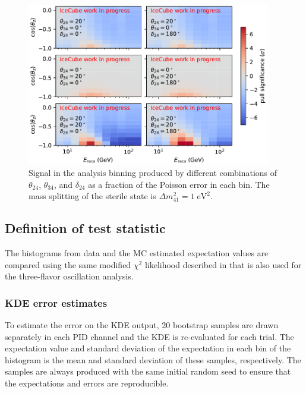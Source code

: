 \begin{figure}
    \centering
    \includegraphics[width=0.95\textwidth]{figures/measurement/sterile_analysis/oscillation_signal/pull_theta_combinations_20deg_dcp24.pdf}
    \caption{Signal in the analysis binning produced by different combinations of $\theta_{24}$, $\theta_{34}$, and $\delta_{24}$ as a fraction of the Poisson error in each bin. The mass splitting of the sterile state is $\Delta m^2_{41}=1\;\mathrm{eV^2}$.}
    \label{fig:oscillation-effects-ana-binning}
\end{figure}

\subsection{Definition of test statistic}
\label{sec:test-statistic-sterile}

The histograms from data and the MC estimated expectation values are compared using the same modified $\chi^2$ likelihood described in  that is also used for the three-flavor oscillation analysis.

\subsubsection{KDE error estimates}
To estimate the error on the KDE output, 20 bootstrap samples are drawn separately in each PID channel and the KDE is re-evaluated for each trial. The expectation value and standard deviation of the expectation in each bin of the histogram is the mean and standard deviation of these samples, respectively. The samples are always produced with the same initial random seed to ensure that the expectations and errors are reproducible.

